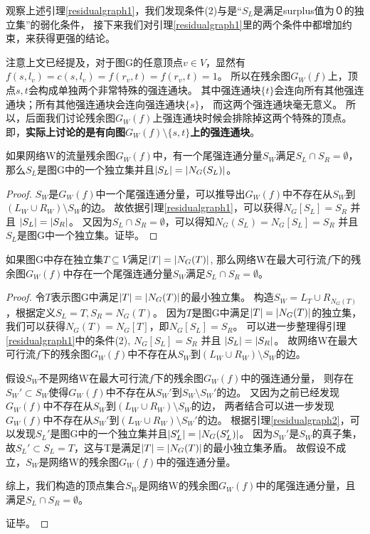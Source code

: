 观察上述引理\ref{residualgraph1}，我们发现条件(2)与是“$S_L$是满足surplus值为０的独立集”的弱化条件，
接下来我们对引理\ref{residualgraph1}里的两个条件中都增加约束，来获得更强的结论。

注意上文已经提及，对于图G的任意顶点$v \in V$，显然有$f(s, l_v) = c(s, l_v) = f(r_v, t) = f(r_v, t) = 1$。
所以在残余图$G_W(f)$上，顶点$s,t$会构成单独两个非常特殊的强连通块。
其中强连通块$\{t\}$会连向所有其他强连通块；所有其他强连通块会连向强连通块$\{s\}$，
而这两个强连通块毫无意义。
所以，后面我们讨论残余图$G_W(f)$上强连通块时候会排除掉这两个特殊的顶点。
即，\textbf{实际上讨论的是有向图$G_W(f) \setminus \{s, t\}$上的强连通块}。


\begin{lemma} \label{residualgraph2}
如果网络W的流量残余图$G_W(f)$中，有一个尾强连通分量$S_W$满足$S_L \cap S_R = \emptyset$，
那么$S_L$是图G中的一个独立集并且$\left\vert S_L \right\vert = \left\vert N_G(S_L) \right\vert$。
\end{lemma}
\begin{proof}
$S_W$是$G_W(f)$中一个尾强连通分量，可以推导出$G_W(f)$中不存在从$S_W$到$(L_W \cup R_W) \setminus S_W$的边。
故依据引理\ref{residualgraph1}，可以获得$N_G[S_L] = S_R$ 并且 $\left\vert S_L \right\vert = \left\vert S_R \right\vert$。
又因为$S_L \cap S_R = \emptyset$，可以得知$N_G(S_L) = N_G[S_L] = S_R$ 并且 $S_L$是图G中一个独立集。证毕。
\end{proof}

\begin{lemma} \label{residualgraph3}
如果图G中存在独立集$T \subseteq V$满足$\left\vert T \right\vert = \left\vert N_G(T) \right\vert$,
那么网络W在最大可行流$f$下的残余图$G_W(f)$中存在一个尾强连通分量$S_W$满足$S_L \cap S_R = \emptyset$。
\end{lemma}
\begin{proof}
令$T$表示图G中满足$\left\vert T \right\vert = \left\vert N_G(T) \right\vert$的最小独立集。
构造$S_W = L_T \cup R_{N_G(T)}$，根据定义$S_L = T, S_R = N_G(T)$。
因为$T$是图G中满足$\left\vert T \right\vert = \left\vert N_G(T) \right\vert$的独立集，
我们可以获得$N_G(T) = N_G[T]$，即$N_G[S_L] = S_R$。
可以进一步整理得引理\ref{residualgraph1}中的条件(2), $N_G[S_L] = S_R$ 并且 $\left\vert S_L \right\vert = \left\vert S_R \right\vert$。
故网络W在最大可行流$f$下的残余图$G_W(f)$中不存在从$S_W$到$(L_W \cup R_W) \setminus S_W$的边。

假设$S_W$不是网络W在最大可行流$f$下的残余图$G_W(f)$中的强连通分量，
则存在$S_W' \subset S_W$使得$G_W(f)$中不存在从$S_W'$到$S_W \setminus S_W'$的边。
又因为之前已经发现$G_W(f)$中不存在从$S_W$到$(L_W \cup R_W) \setminus S_W$的边，
两者结合可以进一步发现$G_W(f)$中不存在从$S_W'$到$(L_W \cup R_W) \setminus S_W'$的边。
根据引理\ref{residualgraph2}，可以发现$S_L'$是图G中的一个独立集并且$\left\vert S_L' \right\vert = \left\vert N_G(S_L') \right\vert$。
因为$S_W'$是$S_W$的真子集，故$S_L' \subset S_L = T$，这与T是满足$\left\vert T \right\vert = \left\vert N_G(T) \right\vert$的最小独立集矛盾。
故假设不成立，$S_W$是网络W的残余图$G_W(f)$中的强连通分量。

综上，我们构造的顶点集合$S_W$是网络W的残余图$G_W(f)$中的尾强连通分量，且满足$S_L \cap S_R = \emptyset$。

证毕。
\end{proof}

